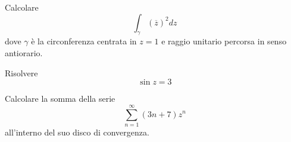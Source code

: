 \Esercizio{}

Calcolare
\begin{equation*}
\int\nolimits_{\gamma}\left(\overline{z}\right)^{2} dz
\end{equation*}
dove $\gamma $ è la circonferenza centrata in $z = 1$ e raggio unitario percorsa in senso antiorario.

\Esercizio{}

Risolvere
\begin{equation*}
\sin z = 3
\end{equation*}

\Esercizio{}

Calcolare la somma della serie
\begin{equation*}
\sum\limits^{\infty}_{n = 1}\left(3n + 7\right) z^{n}
\end{equation*}
all'interno del suo disco di convergenza.

\ParteSoluzioni

\Soluzione

